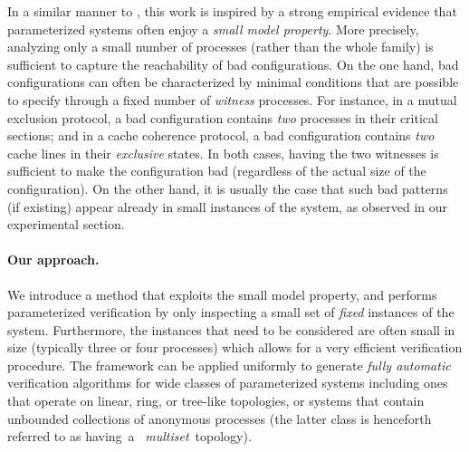 In a similar manner to \cite{cutoff}, this work is inspired by a
strong empirical evidence that parameterized systems often enjoy a
{\it small model property}.
%
More precisely, analyzing only a small number of processes (rather
than the whole family) is sufficient to capture the reachability of
bad configurations.
%
%
On the one hand, bad configurations can often be characterized by
minimal conditions that are possible to specify through a fixed number
of {\it witness} processes.
%
For instance, in a mutual exclusion protocol, a bad configuration
contains {\it two} processes in their critical sections; and in a
cache coherence protocol, a bad configuration contains {\it two} cache
lines in their {\it exclusive} states.
%
In both cases, having the two witnesses is sufficient
to make the configuration bad 
(regardless of the actual size of the configuration).
%
On the other hand, it is usually the case that such bad patterns (if
existing) appear already in small instances of the system, as observed
in our experimental section.%

\paragraph{Our approach.}
%
We introduce a method that exploits the small model property, and
performs parameterized verification by only inspecting a small set of
{\it fixed} instances of the system.
%
%
Furthermore, the instances that need to be considered are 
often small in size
(typically three or four processes) which allows for a very
efficient verification procedure.
%
The framework can be applied uniformly
to generate {\it fully automatic} verification algorithms
for wide classes of parameterized systems including ones that
operate on linear, ring, or tree-like topologies, or systems
that contain unbounded collections of anonymous processes
 (the latter class is henceforth referred to as having~a~{\it
multiset}~topology).
%

